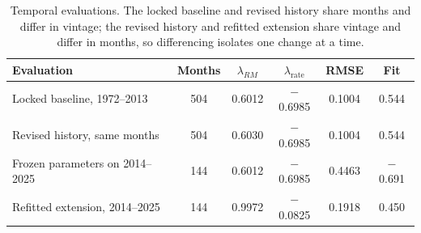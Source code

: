 \begin{table}[htbp]
\centering
\caption{Temporal evaluations. The locked baseline and revised history share
months and differ in vintage; the revised history and refitted extension share
vintage and differ in months, so differencing isolates one change at a time.}
\label{tab:temporal}
\begin{tabular}{lccccc}
\toprule
Evaluation & Months & $\lambda_{RM}$ & $\lambda_{\text{rate}}$ & RMSE & Fit \\
\midrule
Locked baseline, 1972--2013 & 504 & 0.6012 & $-$0.6985 & 0.1004 & 0.544 \\ %
Revised history, same months & 504 & 0.6030 & $-$0.6985 & 0.1004 & 0.544 \\ %
Frozen parameters on 2014--2025 & 144 & 0.6012 & $-$0.6985 & 0.4463 & $-$0.691 \\ %
Refitted extension, 2014--2025 & 144 & 0.9972 & $-$0.0825 & 0.1918 & 0.450 \\ %
\bottomrule
\end{tabular}
\end{table}
